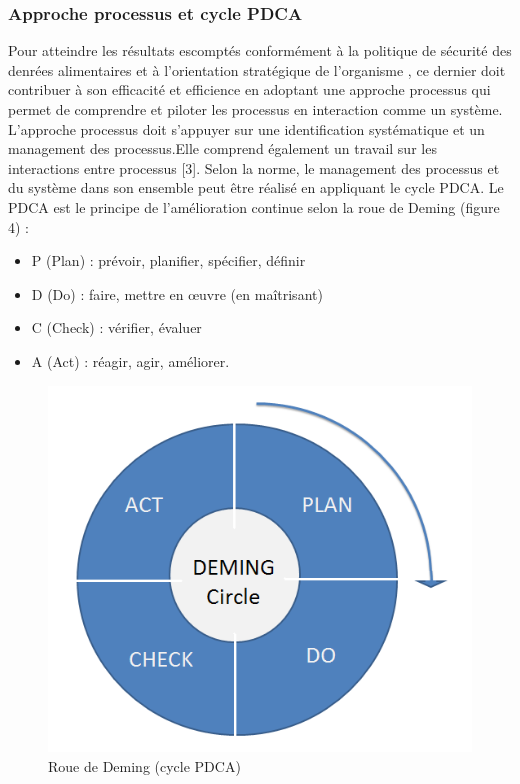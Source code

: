 \begin{spacing}{1.2}
\subsubsection{Approche processus et cycle PDCA}

Pour atteindre les résultats escomptés conformément à la politique de sécurité des denrées alimentaires et à l’orientation stratégique de l’organisme , ce dernier  doit contribuer à son efficacité et efficience en adoptant une approche processus qui permet de comprendre et piloter les processus en interaction comme un système. L’approche processus doit s’appuyer sur une identification systématique et un management des processus.Elle comprend également un travail sur les interactions entre processus [3].  Selon la norme, le management des processus et du système dans son ensemble peut être réalisé en appliquant le cycle PDCA. Le PDCA est le principe de l’amélioration continue selon la  roue de Deming (figure 4) :
\begin{itemize}
	\item P (Plan) : prévoir, planifier, spécifier, définir
	\item D (Do) : faire, mettre en œuvre (en maîtrisant)
	\item C (Check) : vérifier, évaluer
	\item A (Act) : réagir, agir, améliorer.
\end{itemize}

\begin{figure}[!ht]\centering
\includegraphics[scale=0.3]{image2.png}
\caption{Roue de Deming (cycle PDCA)}
\label{fig:fig1}
\end{figure}



\end{spacing}
